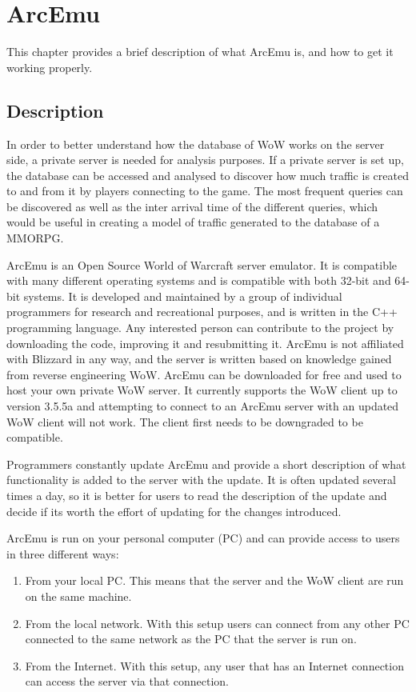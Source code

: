 \chapter{ArcEmu} %
\label{ch3}

This chapter provides a brief description of what ArcEmu is, and how to get it working properly.

\section{Description}
In order to better understand how the database of WoW works on the server side, a private server is needed for analysis purposes. If a private server is set up, the database can be accessed and analysed to discover how much traffic is created to and from it by players connecting to the game. The most frequent queries can be discovered as well as the inter arrival time of the different queries, which would be useful in creating a model of traffic generated to the database of a MMORPG.

ArcEmu is an Open Source World of Warcraft server emulator. It is compatible with many different operating systems and is compatible with both 32-bit and 64-bit systems. It is developed and maintained by a group of individual programmers for research and recreational purposes, and is written in the C++ programming language. Any interested person can contribute to the project by downloading the code, improving it and resubmitting it. 
ArcEmu is not affiliated with Blizzard in any way, and the server is written based on knowledge gained from reverse engineering WoW. ArcEmu can be downloaded for free and used to host your own private WoW server. It currently supports the WoW client up to version 3.5.5a and attempting to connect to an ArcEmu server with an updated WoW client will not work. The client first needs to be downgraded to be compatible.

Programmers constantly update ArcEmu and provide a short description of what functionality is added to the server with the update. It is often updated several times a day, so it is better for users to read the description of the update and decide if its worth the effort of updating for the changes introduced.

ArcEmu is run on your personal computer (PC) and can provide access to users in three different ways:

\begin{enumerate}
	\item From your local PC. 
	This means that the server and the WoW client are run on the same machine.
	\item From the local network.
	With this setup users can connect from any other PC connected to the same network as the PC that the server is run on.
	\item From the Internet.
	With this setup, any user that has an Internet connection can access the server via that connection.
\end{enumerate}

